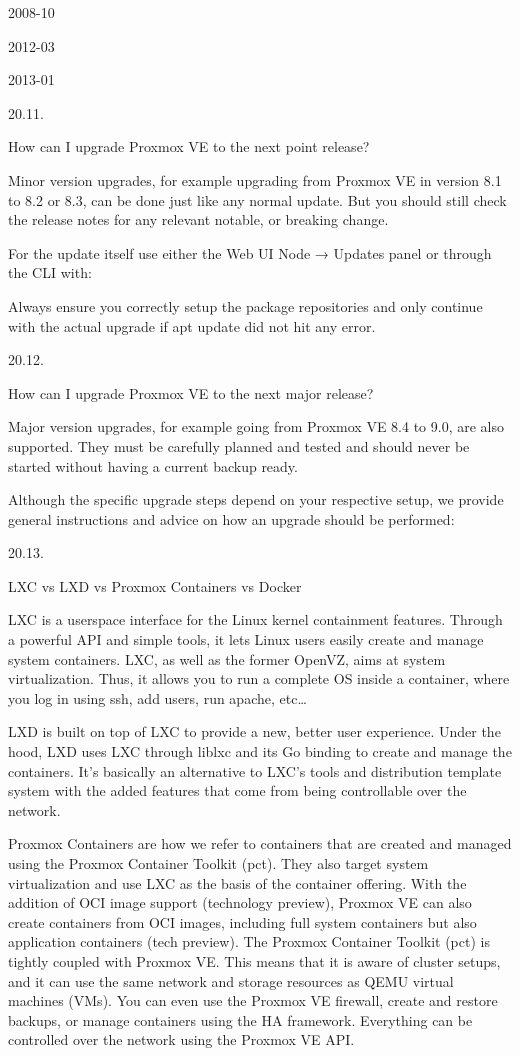 2008-10

2012-03

2013-01

20.11.

How can I upgrade Proxmox VE to the next point release?

Minor version upgrades, for example upgrading from Proxmox VE in version 8.1 to 8.2 or 8.3, can be done just like any normal update. But you should still check the release notes for any relevant notable, or breaking change.

For the update itself use either the Web UI Node → Updates panel or through the CLI with:

Always ensure you correctly setup the package repositories and only continue with the actual upgrade if apt update did not hit any error.

20.12.

How can I upgrade Proxmox VE to the next major release?

Major version upgrades, for example going from Proxmox VE 8.4 to 9.0, are also supported. They must be carefully planned and tested and should never be started without having a current backup ready.

Although the specific upgrade steps depend on your respective setup, we provide general instructions and advice on how an upgrade should be performed:

20.13.

LXC vs LXD vs Proxmox Containers vs Docker

LXC is a userspace interface for the Linux kernel containment features. Through a powerful API and simple tools, it lets Linux users easily create and manage system containers. LXC, as well as the former OpenVZ, aims at system virtualization. Thus, it allows you to run a complete OS inside a container, where you log in using ssh, add users, run apache, etc…

LXD is built on top of LXC to provide a new, better user experience. Under the hood, LXD uses LXC through liblxc and its Go binding to create and manage the containers. It’s basically an alternative to LXC’s tools and distribution template system with the added features that come from being controllable over the network.

Proxmox Containers are how we refer to containers that are created and managed using the Proxmox Container Toolkit (pct). They also target system virtualization and use LXC as the basis of the container offering. With the addition of OCI image support (technology preview), Proxmox VE can also create containers from OCI images, including full system containers but also application containers (tech preview). The Proxmox Container Toolkit (pct) is tightly coupled with Proxmox VE. This means that it is aware of cluster setups, and it can use the same network and storage resources as QEMU virtual machines (VMs). You can even use the Proxmox VE firewall, create and restore backups, or manage containers using the HA framework. Everything can be controlled over the network using the Proxmox VE API.

